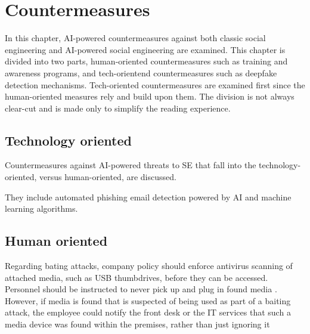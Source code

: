 



\chapter{Countermeasures\label{countermeasures}}
\begin{comment}


\end{comment}


In this chapter, AI-powered countermeasures against both classic social engineering and AI-powered social engineering are examined. This chapter is divided into two parts, human-oriented countermeasures such as training and awareness programs, and tech-orientend countermeasures such as deepfake detection mechanisms. Tech-oriented countermeasures are examined first since the human-oriented measures rely and build upon them. The division is not always clear-cut and is made only to simplify the reading experience.


\section{Technology oriented}
\begin{comment}
    
    - 

\end{comment}

Countermeasures against AI-powered threats to SE that fall into the technology-oriented, versus human-oriented, are discussed.

They include automated phishing email detection powered by AI and machine learning algorithms.


\section{Human oriented}
\begin{comment}
    
    - 

\end{comment}


Regarding bating attacks, company policy should enforce antivirus scanning of attached media, such as USB thumbdrives, before they can be accessed. Personnel should be instructed to never pick up and plug in found media \citep{salahdine_social_2019}. However, if media is found that is suspected of being used as part of a baiting attack, the employee could notify the front desk or the IT services that such a media device was found within the premises, rather than just ignoring it 

